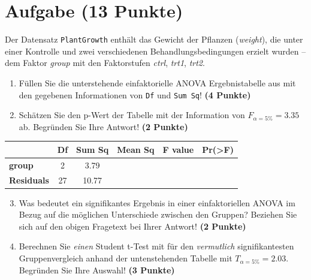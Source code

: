 \documentclass[a4paper, 10pt]{scrartcl}\usepackage[]{graphicx}\usepackage[]{xcolor}
\begin{document}
\section{Aufgabe \hfill (13 Punkte)}


Der Datensatz \texttt{PlantGrowth} enth{\"a}lt das Gewicht der Pflanzen
(\textit{weight}), die unter einer Kontrolle und zwei verschiedenen
Behandlungsbedingungen erzielt wurden -- dem Faktor \textit{group} mit den
Faktorstufen \textit{ctrl}, \textit{trt1}, \textit{trt2}.



\begin{enumerate}
\item F{\"u}llen Sie die unterstehende einfaktorielle ANOVA Ergebnistabelle aus
  mit den gegebenen Informationen von \texttt{Df} und \texttt{Sum Sq}!
  \textbf{(4 Punkte)}
\item Sch{\"a}tzen Sie den p-Wert der Tabelle mit der Information von
  $F_{\alpha = 5\%} = 3.35$ ab. Begr{\"u}nden Sie Ihre
  Antwort! \textbf{(2 Punkte)}
\end{enumerate}

\vspace{1Ex}

\begin{center}
  \Large
  \begin{tabular}{l|c|c|c|c|c}
     & \textbf{Df} & \textbf{Sum Sq} & \textbf{Mean Sq} & \textbf{F value} & \textbf{Pr(>F)} \strut\\
    \hline
   \textbf{group}  & 2 & 3.79 &  &  &  \strut\\
    \hline
   \textbf{Residuals}  & 27 & 10.77 &  &  &  \strut\\
  \end{tabular}
\end{center}

\vspace{1Ex}

\begin{enumerate}
  \setcounter{enumi}{2}
\item Was bedeutet ein signifikantes Ergebnis in einer einfaktoriellen
  ANOVA im Bezug auf die m{\"o}glichen Unterschiede zwischen den Gruppen? Beziehen Sie sich auf den obigen Fragetext bei Ihrer Antwort!
  \textbf{(2 Punkte)}
\item Berechnen Sie \textit{einen} Student t-Test mit f{\"u}r den \textit{vermutlich}
  signifikantesten Gruppenvergleich anhand der untenstehenden Tabelle mit
  $T_{\alpha = 5\%} = 2.03$. Begr{\"u}nden Sie Ihre Auswahl! \textbf{(3 Punkte)}
\end{enumerate}
\end{document}
